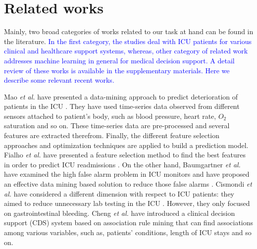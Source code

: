\section{Related works} \label{s:related}
Mainly, two broad categories of works related to our task at hand can be found in the literature. \textcolor{blue} {In the first category, the studies deal with ICU patients for various clinical and healthcare support systems, whereas, other category of related work addresses machine learning in general for medical decision support. A detail review of these works is available in the supplementary materials. Here we describe some relevant recent works.}

Mao \textit{et al.} have presented a data-mining approach to predict deterioration of patients in the ICU \cite{Mao}. They have used time-series data observed from different sensors attached to patient’s body, such as blood pressure, heart rate, $O_2$ saturation and so on. These time-series data are pre-processed and several features are extracted therefrom. Finally, the different feature selection approaches and optimization techniques are applied to build a prediction model. Fialho \textit{et al.} have presented a feature selection method to find the best features in order to predict ICU readmissions \cite{Fialho}. On the other hand, Baumgartner \textit{et al.} have examined the high false alarm problem in ICU monitors and have proposed an effective data mining based solution to reduce those false alarms \cite{Baumgartner}. Cismondi \textit{et al.} have considered a different dimension with respect to ICU patients: they aimed to reduce unnecessary lab testing in the ICU \cite{Cismondi}. However, they only focused on gastrointestinal bleeding. Cheng \textit{et al.} have introduced a clinical decision support (CDS) system based on association rule mining that can find associations among various variables, such as, patients’ conditions, length of ICU stays and so on. 


